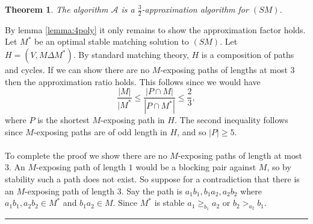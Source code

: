 \documentclass[letterpaper,12pt,oneside,onecolumn]{article}
\newcommand{\cA}{\mathcal{A}} \newcommand{\cB}{\mathcal{B}}
\newenvironment{proof}{{\bf Proof:  }}{\hfill\rule{2mm}{2mm}}
\newtheorem{theorem}[fact]{Theorem}
\begin{document}
\begin{theorem}
The algorithm $\cA$ is a $\frac{3}{2}$-approximation algorithm for $(SM)$.
\end{theorem}
\begin{proof}
By lemma \ref{lemma:4poly} it only remains to show the approximation factor holds. Let $M^*$ be an optimal stable matching solution to $(SM)$. Let $H = (V, M \Delta M^*)$. By standard matching theory, $H$ is a composition of paths and cycles. If we can show there are no $M$-exposing paths of lengths at most $3$ then the approximation ratio holds. This follows since we would have $$\frac{|M|}{|M^*} \leq \frac{|P \cap M|}{|P\cap M^*|} \leq \frac{2}{3},$$
where $P$ is the shortest $M$-exposing path in $H$. The second inequality follows since $M$-exposing paths are of odd length in $H$, and so $|P| \geq 5$.
\paragraph{}
To complete the proof we show there are no $M$-exposing paths of length at most $3$. An $M$-exposing path of length $1$ would be a blocking pair against $M$, so by stability such a path does not exist. So suppose for a contradiction that there is an $M$-exposing path of length $3$. Say the path is $a_1b_1, b_1a_2,a_2b_2$ where $a_1b_1,a_2b_2 \in M^*$ and $b_1a_2 \in M$. Since $M^*$ is stable $a_1 \geq_{b_1} a_2$ or $b_2 >_{a_2} b_1$.
\end{proof}
\end{document}
